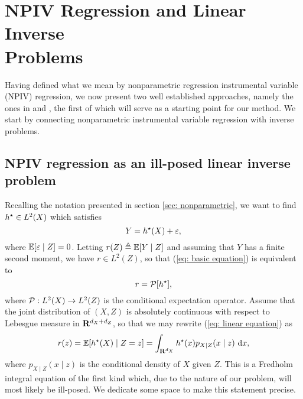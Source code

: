 \chapter{NPIV Regression and Linear Inverse \\Problems}
\label{chap: npiv and lip}

Having defined what we mean by nonparametric regression instrumental variable (NPIV) regression, we now present two well established approaches, namely the ones in \cite{darolles2011} and \cite{newey2003}, the first of which will serve as a starting point for our method.
We start by connecting nonparametric instrumental variable regression with inverse problems.

\section{NPIV regression as an ill-posed linear inverse problem}
\label{sec: npiv and ill posed lip}

Recalling the notation presented in section \ref{sec: nonparametric}, we want to find $ h^{ \star } \in L^{ 2 } ( X ) $ which satisfies
\begin{equation}
    \label{eq: basic equation}
    Y = h^{ \star } ( X ) + \varepsilon
,\end{equation}
where $ \mathbb{E} [ \varepsilon \mid Z ] = 0 $.
Letting $ r ( Z ) \triangleq \mathbb{E} [ Y \mid Z ] $ and assuming that $ Y $ has a finite second moment, we have $ r \in L^{ 2 } ( Z ) $, so that (\ref{eq: basic equation}) is equivalent to
\begin{equation}
    \label{eq: linear equation}
    r = \mathcal{P} [ h^{ \star } ]
,\end{equation}
where $ \mathcal{P} : L^{ 2 } ( X ) \to L^{ 2 } ( Z ) $ is the conditional expectation operator.
Assume that the joint distribution of $ ( X, Z ) $ is absolutely continuous with respect to Lebesgue measure in $ \mathbf{R}^{ d_{ X } + d_{ Z } } $, so that we may rewrite (\ref{eq: linear equation}) as
\begin{equation}
    \label{eq: expectation equation}
    r ( z ) = \mathbb{E} [ h^{ \star } ( X ) \mid Z = z ] = \int_{ \mathbf{R}^{ d_{ X } } } h^{ \star } ( x ) p_{ X \mid Z } ( x \mid z ) \ \mathrm{d} x
,\end{equation}
where $ p_{ X\mid Z } ( x \mid z ) $ is the conditional density of $ X $ given $ Z $.
This is a Fredholm integral equation of the first kind \cite{kress89} which, due to the nature of our problem, will most likely be ill-posed.
We dedicate some space to make this statement precise.

